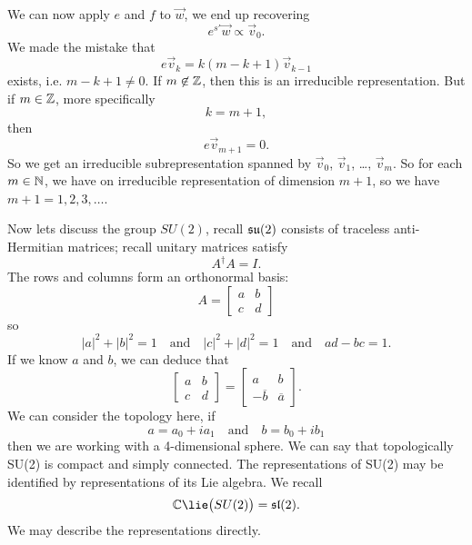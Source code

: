 We can now apply $e$ and $f$ to $\vec{w}$, we end up recovering
\begin{equation}
e^{s'}\vec{w}\propto\vec{v}_{0}.
\end{equation}
We made the mistake that
\begin{equation}
e\vec{v}_{k}=k(m-k+1)\vec{v}_{k-1}
\end{equation}
exists, i.e. $m-k+1\not=0$. If $m\not\in\Bbb{Z}$, then this is an
irreducible representation. But if $m\in\Bbb{Z}$, more
specifically
\begin{equation}
k=m+1,
\end{equation}
then
\begin{equation}
e\vec{v}_{m+1}=0.
\end{equation}
So we get an irreducible subrepresentation spanned by
$\vec{v}_{0}$, $\vec{v}_{1}$, \dots, $\vec{v}_{m}$. So for each
$m\in\Bbb{N}$, we have on irreducible representation of dimension
$m+1$, so we have $m+1=1,2,3,\dots$.

Now lets discuss the group $SU(2)$, recall $\frak{su}(2)$
consists of traceless anti-Hermitian matrices; recall unitary
matrices satisfy
\begin{equation}
A^{\dagger}A=I.
\end{equation}
The rows and columns form an orthonormal basis:
\begin{equation}
A = \begin{bmatrix}a&b\\c&d\end{bmatrix}
\end{equation}
so
\begin{equation}
|a|^{2}+|b|^{2}=1\quad\mbox{and}\quad|c|^{2}+|d|^{2}=1\quad\mbox{and}\quad ad-bc=1.
\end{equation}
If we know $a$ and $b$, we can deduce that
\begin{equation}
\begin{bmatrix}
a&b\\c&d
\end{bmatrix}=
\begin{bmatrix}
a&b\\
-\overline{b}&\overline{a}
\end{bmatrix}.
\end{equation}
We can consider the topology here, if
\begin{equation}
a=a_{0}+ia_{1}\quad\mbox{and}\quad b=b_{0}+ib_{1}
\end{equation}
then we are working with a 4-dimensional sphere. We can say that
topologically SU(2) is compact and simply connected. The
representations of SU(2) may be identified by representations of
its Lie algebra. We recall
\begin{equation}
\Bbb{C}\lie\big(SU(2)\big)=\frak{sl}(2).
\end{equation}
We may describe the representations directly.

